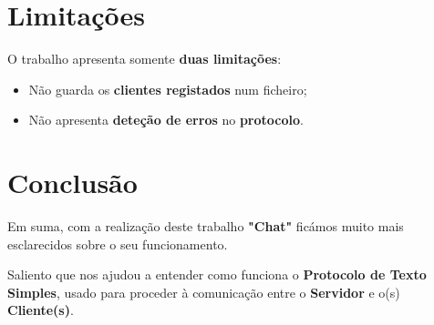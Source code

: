 \documentclass[11pt]{article}   %
\begin{document}
\section{Limitações}

O trabalho apresenta somente \textbf{duas limitações}:
\begin{itemize}
    \item Não guarda os \textbf{clientes registados} num ficheiro;
    \item Não apresenta \textbf{deteção de erros} no \textbf{protocolo}.
\end{itemize}

\section{Conclusão} %
\hspace{0,5cm}Em suma, com a realização deste trabalho \textbf{"Chat"} ficámos muito 
mais esclarecidos sobre o seu funcionamento. \par
Saliento que nos ajudou a entender como funciona o \textbf{Protocolo de Texto Simples}, 
usado para proceder à comunicação entre o \textbf{Servidor} e o(s) \textbf{Cliente(s)}. 

\end{document}
